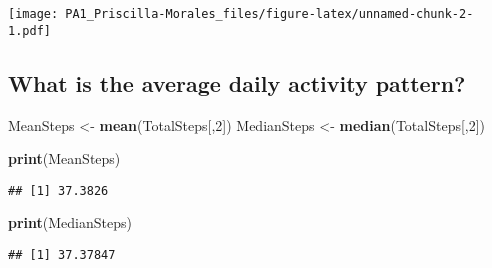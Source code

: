 \documentclass[
]{article}
\newenvironment{Shaded}{\begin{snugshade}}{\end{snugshade}}
\newcommand{\CommentTok}[1]{\textcolor[rgb]{0.56,0.35,0.01}{\textit{#1}}}
\newcommand{\DataTypeTok}[1]{\textcolor[rgb]{0.13,0.29,0.53}{#1}}
\newcommand{\DecValTok}[1]{\textcolor[rgb]{0.00,0.00,0.81}{#1}}
\newcommand{\FloatTok}[1]{\textcolor[rgb]{0.00,0.00,0.81}{#1}}
\newcommand{\KeywordTok}[1]{\textcolor[rgb]{0.13,0.29,0.53}{\textbf{#1}}}
\newcommand{\NormalTok}[1]{#1}
\newcommand{\OperatorTok}[1]{\textcolor[rgb]{0.81,0.36,0.00}{\textbf{#1}}}
\newcommand{\StringTok}[1]{\textcolor[rgb]{0.31,0.60,0.02}{#1}}
\begin{document}
\texttt{[image: PA1\_Priscilla-Morales\_files/figure-latex/unnamed-chunk-2-1.pdf]}

\hypertarget{what-is-the-average-daily-activity-pattern}{%
\subsection{What is the average daily activity
pattern?}\label{what-is-the-average-daily-activity-pattern}}

\begin{Shaded}
\begin{Highlighting}[]
\NormalTok{MeanSteps <-}\StringTok{ }\KeywordTok{mean}\NormalTok{(TotalSteps[,}\DecValTok{2}\NormalTok{])}
\NormalTok{MedianSteps <-}\StringTok{ }\KeywordTok{median}\NormalTok{(TotalSteps[,}\DecValTok{2}\NormalTok{])}

\KeywordTok{print}\NormalTok{(MeanSteps)}
\end{Highlighting}
\end{Shaded}

\begin{verbatim}
## [1] 37.3826
\end{verbatim}

\begin{Shaded}
\begin{Highlighting}[]
\KeywordTok{print}\NormalTok{(MedianSteps)}
\end{Highlighting}
\end{Shaded}

\begin{verbatim}
## [1] 37.37847
\end{verbatim}

\begin{Shaded}
\end{Shaded}
\end{document}
